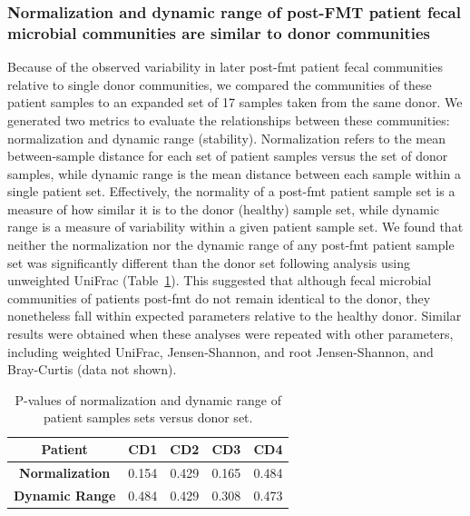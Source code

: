 \subsubsection{Normalization and dynamic range of post-FMT patient fecal microbial communities are similar to donor communities}

Because of the observed variability in later post-\gls{fmt} patient fecal communities relative to single donor communities, we compared the communities of these patient samples to an expanded set of 17 samples taken from the same donor. We generated two metrics to evaluate the relationships between these communities: normalization and dynamic range (stability). Normalization refers to the mean between-sample distance for each set of patient samples versus the set of donor samples, while dynamic range is the mean distance between each sample within a single patient set. Effectively, the normality of a post-\gls{fmt} patient sample set is a measure of how similar it is to the donor (healthy) sample set, while dynamic range is a measure of variability within a given patient sample set. We found that neither the normalization nor the dynamic range of any post-\gls{fmt} patient sample set was significantly different than the donor set following analysis using unweighted UniFrac  (Table~\ref{moviefmt-tab1}). This suggested that although fecal microbial communities of patients post-\gls{fmt} do not remain identical to the donor, they nonetheless fall within expected parameters relative to the healthy donor. Similar results were obtained when these analyses were repeated with other parameters, including weighted UniFrac, Jensen-Shannon,  and root Jensen-Shannon, and Bray-Curtis (data not shown).

\begin{table}[hbtp]
    \caption{P-values of normalization and dynamic range of patient samples sets versus donor set.}
    \label{moviefmt-tab1}
    \centering
    \begin{tabular}{ccccc}
    \toprule
        \textbf{Patient} &    CD1 &    CD2 &    CD3 & CD4\\
    \midrule
        \textbf{Normalization} &    0.154 & 0.429 &    0.165 & 0.484\\
        \textbf{Dynamic Range} &    0.484 & 0.429 &    0.308 & 0.473\\
    \bottomrule
    \end{tabular}
    
\end{table}

